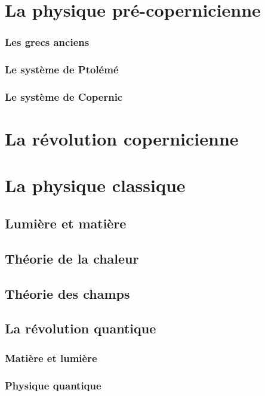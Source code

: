 

\section{La physique pré-copernicienne}
    \subsubsection{Les grecs anciens}
    \subsubsection{Le système de Ptolémé}
    \subsubsection{Le système de Copernic}

\section{La révolution copernicienne}

\section{La physique classique}
  \subsection{Lumière et matière}
  \subsection{Théorie de la chaleur}
  \subsection{Théorie des champs}

\subsection{La révolution quantique}
    \subsubsection{Matière et lumière}
    \subsubsection{Physique quantique}

